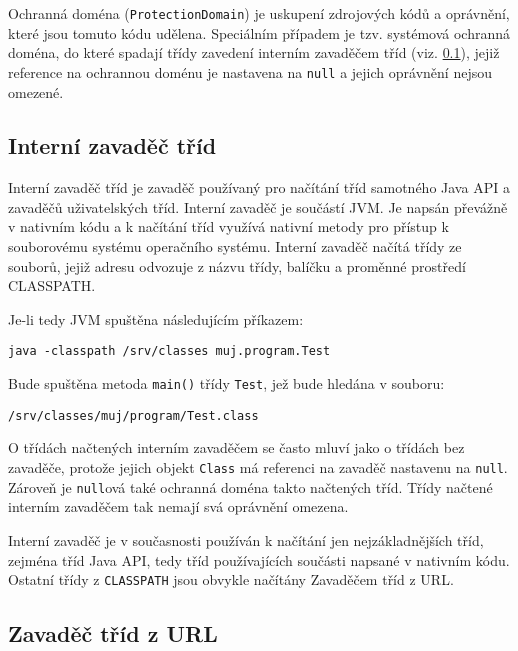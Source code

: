 Ochranná doména ({\tt ProtectionDomain}) je uskupení zdrojových kódů a oprávnění, které jsou tomuto kódu udělena.
Speciálním případem je tzv. systémová ochranná doména, do které spadají třídy zavedení interním zavaděčem tříd (viz. \ref{interniZavadec}), jejiž reference na ochrannou doménu je nastavena na {\tt null} a jejich oprávnění nejsou omezené. \cite[5.4]{oaks}

\subsection{Interní zavaděč tříd} \label{interniZavadec}

Interní zavaděč tříd je zavaděč používaný pro načítání tříd samotného Java API a zavaděčů uživatelských tříd.
Interní zavaděč je součástí JVM. Je napsán převážně v nativním kódu a k načítání tříd využívá nativní metody pro přístup k souborovému systému operačního systému.
Interní zavaděč načítá třídy ze souborů, jejiž adresu odvozuje z názvu třídy, balíčku a proměnné prostředí CLASSPATH. \cite[3.2.1]{oaks}

Je-li tedy JVM spuštěna následujícím příkazem:

\begin{verbatim}
java -classpath /srv/classes muj.program.Test
\end{verbatim}

Bude spuštěna metoda {\tt main()} třídy {\tt Test}, jež bude hledána v souboru:

\begin{verbatim}
/srv/classes/muj/program/Test.class
\end{verbatim}

O třídách načtených interním zavaděčem se často mluví jako o třídách bez zavaděče, protože jejich objekt {\tt Class} má referenci na zavaděč nastavenu na {\tt null}. \cite[3.2.1]{oaks} Zároveň je {\tt null}ová také ochranná doména takto načtených tříd. Třídy načtené interním zavaděčem tak nemají svá oprávnění omezena.

Interní zavaděč je v současnosti používán k načítání jen nejzákladnějších tříd, zejména tříd Java API, tedy tříd používajících součásti napsané v nativním kódu. Ostatní třídy z {\tt CLASSPATH} jsou obvykle načítány Zavaděčem tříd z URL.

\subsection{Zavaděč tříd z URL}


